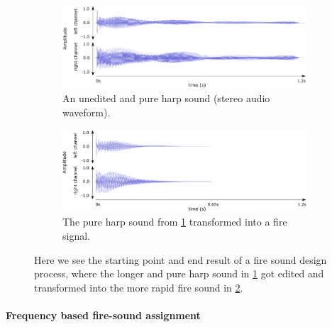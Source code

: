 			\begin{figure}[ht!]
				\centering
					\begin{subfigure}[t]{\textwidth}
						\centering\captionsetup{width=.8\linewidth}%
						\includegraphics[width=\linewidth]{Assets/DocSegments/Chapters/Implementation/Figures/Illustrations/waveform_Strangerous_1_1.pdf}
						\caption{An unedited and pure harp sound (stereo audio waveform).}
						\label{fig:sub:harp_sound}
					\end{subfigure}
					\begin{subfigure}[t]{\textwidth}
						\centering\captionsetup{width=.8\linewidth}%
						\includegraphics[width=\linewidth]{Assets/DocSegments/Chapters/Implementation/Figures/Illustrations/waveform_Strangerous_1_1_fire_signal.pdf}
						\caption{The pure harp sound from \ref{fig:sub:harp_sound} transformed into a fire signal.}
						\label{fig:sub:harp_fire_sound}
					\end{subfigure}
				\caption[Editing a longer and pure harp pluck to become a shorter fire signal.]{Here we see the starting point and end result of a fire sound design process, where the longer and pure harp sound in \ref{fig:sub:harp_sound} got edited and transformed into the more rapid fire sound in \ref{fig:sub:harp_fire_sound}.}
				\label{fig:fire_signal_designing}
			\end{figure}


			\paragraph{Frequency based fire-sound assignment}
			
